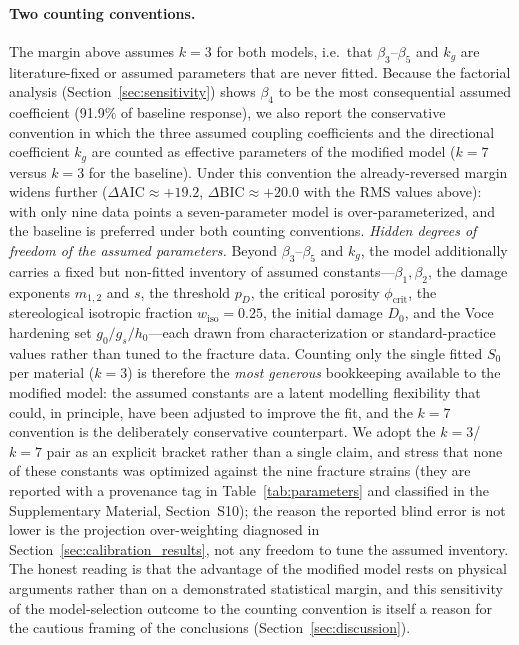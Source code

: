 \documentclass[12pt,a4paper,twocolumn]{article}
\begin{document}
\paragraph{Two counting conventions.} The margin above assumes $k=3$ for both models, i.e.\ that $\beta_3$--$\beta_5$ and $k_g$ are literature-fixed or assumed parameters that are never fitted. Because the factorial analysis (Section~\ref{sec:sensitivity}) shows $\beta_4$ to be the most consequential assumed coefficient (91.9\% of baseline response), we also report the conservative convention in which the three assumed coupling coefficients and the directional coefficient $k_g$ are counted as effective parameters of the modified model ($k = 7$ versus $k = 3$ for the baseline). Under this convention the already-reversed margin widens further ($\Delta\mathrm{AIC} \approx +19.2$, $\Delta\mathrm{BIC} \approx +20.0$ with the RMS values above): with only nine data points a seven-parameter model is over-parameterized, and the baseline is preferred under both counting conventions. \emph{Hidden degrees of freedom of the assumed parameters.} Beyond $\beta_3$--$\beta_5$ and $k_g$, the model additionally carries a fixed but non-fitted inventory of assumed constants---$\beta_1, \beta_2$, the damage exponents $m_{1,2}$ and $s$, the threshold $p_D$, the critical porosity $\phi_{\text{crit}}$, the stereological isotropic fraction $w_{\mathrm{iso}} = 0.25$, the initial damage $D_0$, and the Voce hardening set $g_0/g_s/h_0$---each drawn from characterization or standard-practice values rather than tuned to the fracture data. Counting only the single fitted $S_0$ per material ($k=3$) is therefore the \emph{most generous} bookkeeping available to the modified model: the assumed constants are a latent modelling flexibility that could, in principle, have been adjusted to improve the fit, and the $k=7$ convention is the deliberately conservative counterpart. We adopt the $k=3$/$k=7$ pair as an explicit bracket rather than a single claim, and stress that none of these constants was optimized against the nine fracture strains (they are reported with a provenance tag in Table~\ref{tab:parameters} and classified in the Supplementary Material, Section~S10); the reason the reported blind error is not lower is the projection over-weighting diagnosed in Section~\ref{sec:calibration_results}, not any freedom to tune the assumed inventory. The honest reading is that the advantage of the modified model rests on physical arguments rather than on a demonstrated statistical margin, and this sensitivity of the model-selection outcome to the counting convention is itself a reason for the cautious framing of the conclusions (Section~\ref{sec:discussion}).
\end{document}

